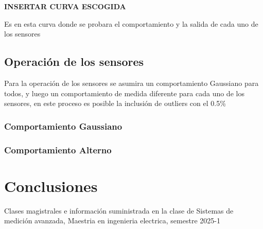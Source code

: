 \documentclass[conference]{IEEEtran}
\begin{document}
\textbf{INSERTAR CURVA ESCOGIDA}

Es en esta curva donde se probara el comportamiento y la salida de cada uno de los sensores

\subsection{Operación de los sensores}

Para la operación de los sensores se asumira un comportamiento Gaussiano para todos, y luego un comportamiento de medida diferente para cada uno de los sensores, en este proceso es posible la inclusión de outliers con el 0.5\%

\subsubsection{Comportamiento Gaussiano}

\subsubsection{Comportamiento Alterno}


\section{Conclusiones}


\begin{thebibliography}{00}

\item Clases magistrales e información suministrada en la clase de Sistemas de medición avanzada, Maestria en ingenieria electrica, semestre 2025-1

\end{thebibliography}
\end{document}
